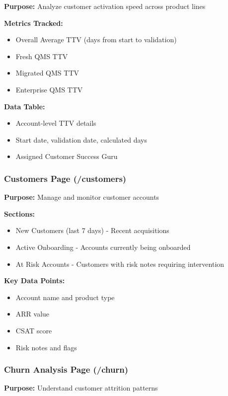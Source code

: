 \documentclass[12pt,a4paper]{article}
\begin{document}
\textbf{Purpose:} Analyze customer activation speed across product lines

\textbf{Metrics Tracked:}
\begin{itemize}
    \item Overall Average TTV (days from start to validation)
    \item Fresh QMS TTV
    \item Migrated QMS TTV
    \item Enterprise QMS TTV
\end{itemize}

\textbf{Data Table:}
\begin{itemize}
    \item Account-level TTV details
    \item Start date, validation date, calculated days
    \item Assigned Customer Success Guru
\end{itemize}

\subsubsection{Customers Page (/customers)}

\textbf{Purpose:} Manage and monitor customer accounts

\textbf{Sections:}
\begin{itemize}
    \item New Customers (last 7 days) - Recent acquisitions
    \item Active Onboarding - Accounts currently being onboarded
    \item At Risk Accounts - Customers with risk notes requiring intervention
\end{itemize}

\textbf{Key Data Points:}
\begin{itemize}
    \item Account name and product type
    \item ARR value
    \item CSAT score
    \item Risk notes and flags
\end{itemize}

\subsubsection{Churn Analysis Page (/churn)}

\textbf{Purpose:} Understand customer attrition patterns
\end{document}
